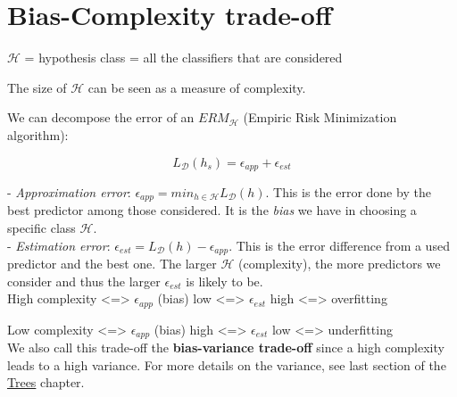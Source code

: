 \section*{Bias-Complexity trade-off}

\label{sec:bias-complexity-trade-off}

\vspace{5mm}

$\mathcal{H}$ = hypothesis class = all the classifiers that are considered

The size of $\mathcal{H}$ can be seen as a measure of complexity.

\vspace{5mm}

We can decompose the error of an $ERM_\mathcal{H}$ (Empiric Risk Minimization algorithm):

$$L_{\mathcal{D}}(h_s) = \epsilon_{app} + \epsilon_{est}$$

- \textit{Approximation error}: $\epsilon_{app} = min_{h \in \mathcal{H}} L_{\mathcal{D}}(h)$. This is the error done by the best predictor among those considered. It is the \textit{bias} we have in choosing a specific class $\mathcal{H}$. \\

- \textit{Estimation error}: $\epsilon_{est} = L_{\mathcal{D}}(h) - \epsilon_{app}$. This is the error difference from a used predictor and the best one. The larger $\mathcal{H}$ (complexity), the more predictors we consider and thus the larger $\epsilon_{est}$ is likely to be. \\

High complexity <=> $\epsilon_{app}$ (bias) low <=> $\epsilon_{est}$ high <=> overfitting

Low complexity <=> $\epsilon_{app}$ (bias) high <=> $\epsilon_{est}$ low <=> underfitting \\

We also call this trade-off the \textbf{bias-variance trade-off} since a high complexity leads to a high variance. For more details on the variance, see last section of the \hyperref[sec:trees]{Trees} chapter.

\vspace{5mm}